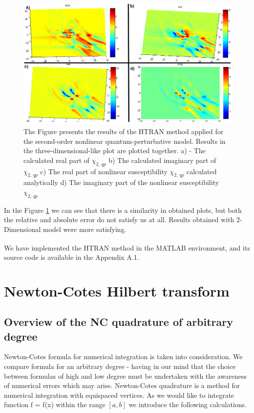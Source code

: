 \documentclass[12pt,twoside,a4paper]{article}
\numberwithin{equation}{subsection}
\numberwithin{figure}{subsection}
\begin{document}
\begin{figure}
  \includegraphics[width=150mm]{img/htran_qp_3d.png}
  \caption{The Figure presents the results of the HTRAN method applied for the second-order nonlinear quantum-perturbative model. Results
  in the three-dimensional-like plot are plotted together.
     a) - The calculated real part of ${\chi_{2, \, qp}}$ 
     b) The calculated imaginary part of ${\chi_{2, \, qp}}$ 
     c) The real part of nonlinear susceptibility ${\chi_{2, \, qp}}$ calculated analytically 
     d) The imaginary part of the nonlinear susceptibility ${\chi_{2, \, qp}}$
     \label{fig:htran_qp_3d}}
\end{figure}

In the Figure \ref{fig:htran_qp_3d} we can see that there is a similarity in obtained plots, but both the relative and absolute
error do not satisfy us at all. Results obtained with 2-Dimensional model were more satisfying.

We have implemented the HTRAN method in the MATLAB \textsuperscript{\textregistered} environment, and its source code is available in
the Appendix A.1.




\section{Newton-Cotes Hilbert transform} \label{chap:nc}

\subsection{Overview of the NC quadrature of arbitrary degree}  \label{chap:nc_quadrature}

Newton-Cotes formula for numerical integration is taken into consideration. We compare formula for an arbitrary degree - having in
our mind that the choice between formulas of high and low degree must be undertaken with the awareness of numerical errors which
may arise. Newton-Cotes quadrature is a method for numerical integration with equispaced vertices. As we would like to integrate
function f = f(x) within the range $[a, b]$ we introduce the following calculations.
\end{document}
